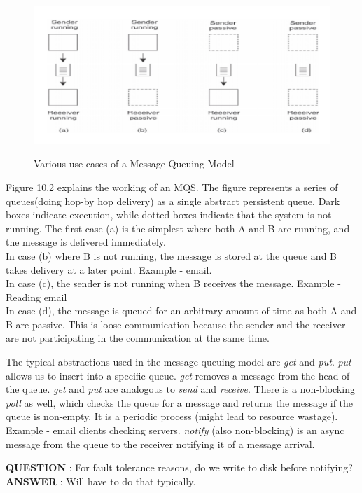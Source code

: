 \documentclass[twoside]{article}
\begin{document}
\begin{figure}
\includegraphics[width=15cm, height=6cm]{MQ.png}
\centering
\caption{Various use cases of a Message Queuing Model }
\end{figure}

Figure 10.2 explains the working of an MQS. The figure represents a series of queues(doing hop-by hop delivery) as a single abstract persistent queue. Dark boxes indicate execution, while dotted boxes indicate that the system is not running. The first case (a) is the simplest where both A and B are running, and the message is delivered immediately. 
\\In case (b) where B is not running, the message is stored at the queue and B takes delivery at a later point. Example - email.
\\ In case (c), the sender is not running when B receives the message. Example - Reading email
\\In case (d), the message is queued for an arbitrary amount of time as both A and B are passive. This is loose communication because the sender and the receiver are not participating in the communication at the same time.

The typical abstractions used in the message queuing model are \textit{get} and \textit{put}. \textit{put} allows us to insert into a specific queue. \textit{get} removes a message from the head of the queue. \textit{get} and \textit{put} are analogous to \textit{send} and \textit{receive}. There is a non-blocking \textit{poll} as well, which checks the queue for a message and  returns the message if the queue is non-empty. It is a periodic process (might lead to resource wastage). Example - email clients checking servers. \textit{notify} (also non-blocking) is an async message from the queue to the receiver notifying it of a message arrival.

\textbf{QUESTION} : For fault tolerance reasons, do we write to disk before notifying?\\ 
\textbf{ANSWER} : Will have to do that typically. 
\end{document}
